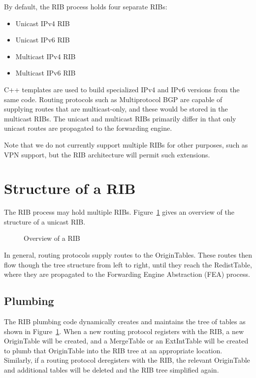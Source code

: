 \documentclass[11pt]{article}
\begin{document}
By default, the RIB process holds four separate RIBs:

\begin{itemize}
  \item Unicast IPv4 RIB
  \item Unicast IPv6 RIB
  \item Multicast IPv4 RIB
  \item Multicast IPv6 RIB
\end{itemize}

C++ templates are used to build specialized IPv4 and IPv6 versions
from the same code.  Routing protocols such as Multiprotocol BGP are
capable of supplying routes that are multicast-only, and these would
be stored in the multicast RIBs.  The unicast and multicast RIBs
primarily differ in that only unicast routes are propagated to the
forwarding engine.

Note that we do not currently support multiple RIBs for other
purposes, such as VPN support, but the RIB architecture will permit
such extensions.

\section{Structure of a RIB}
The RIB process may hold multiple RIBs.  Figure~\ref{fig:rib_overview} gives
an overview of the structure of a unicast RIB.

\begin{figure}[htb]
  \centerline{}
  \vspace{.05in}
  \caption{\label{fig:rib_overview}Overview of a RIB}
\end{figure}

In general, routing protocols supply routes to the OriginTables.
These routes then flow though the tree structure from left to right,
until they reach the RedistTable, where they are propagated to the
Forwarding Engine Abstraction (FEA) process.

\subsection{Plumbing}

The RIB plumbing code dynamically creates and maintains the tree of
tables as shown in Figure~\ref{fig:rib_overview}.  When a new routing protocol
registers with the RIB, a new OriginTable will be created, and a
MergeTable or an ExtIntTable will be created to plumb that OriginTable
into the RIB tree at an appropriate location.  Similarly, if a routing
protocol deregisters with the RIB, the relevant OriginTable and
additional tables will be deleted and the RIB tree simplified again.
\end{document}
